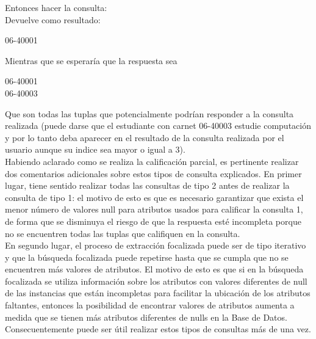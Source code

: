 Entonces hacer la consulta: \\

	Devuelve como resultado:\\

\begin{center}
06-40001\\
\end{center}
	Mientras que se esperaría que la respuesta sea \\

\begin{center}	
06-40001\\
06-40003\\
\end{center}


	Que son todas las tuplas que potencialmente podrían responder a la consulta realizada (puede darse que el estudiante con carnet 06-40003 estudie computación y por lo tanto deba aparecer en el resultado de la consulta realizada por el usuario aunque su indice sea mayor o igual a 3). \\

Habiendo aclarado como se realiza la calificación parcial, es pertinente realizar dos comentarios adicionales sobre estos tipos de consulta explicados. En primer lugar, tiene sentido realizar todas las consultas de tipo 2 antes de realizar la consulta de tipo 1: el motivo de esto es que es necesario garantizar que exista el menor número de valores null para atributos usados para calificar la consulta 1, de forma que se disminuya el riesgo de que la respuesta esté incompleta porque no se encuentren todas las tuplas que califiquen en la consulta. \\

	En segundo lugar, el proceso de extracción focalizada puede ser de tipo iterativo y que la búsqueda focalizada puede repetirse hasta que se cumpla que no se encuentren más valores de atributos. El motivo de esto es que si en la búsqueda focalizada se utiliza información sobre los atributos con valores diferentes de null de las instancias que están incompletas para facilitar la ubicación de los atributos faltantes, entonces la posibilidad de encontrar valores de atributos aumenta a medida que se tienen más atributos diferentes de nulls en la Base de Datos. Consecuentemente puede ser útil realizar estos tipos de consultas más de una vez. \\


